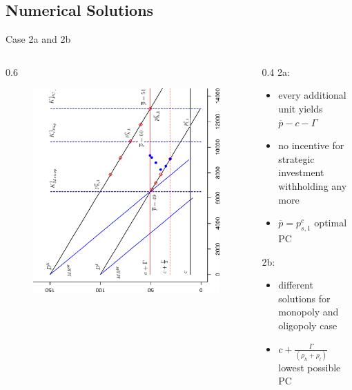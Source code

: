 

\subsection{Numerical Solutions}

\begin{frame} {Case 2a and 2b}
					
\begin{columns}
\begin{column} {0.6\textwidth}
\begin{figure}[h]
\centering
\includegraphics[width=1.0\textwidth, angle=270]{44}
    \label{fig:1}            
\end{figure}
\end{column}

\begin{column} {0.4\textwidth}
2a:
\begin{itemize}
	\item every additional unit yields $\overline{p}- c -\Gamma$
	\item no incentive for strategic investment withholding any more
	\item $\overline{p} = p_{s,1}^{c}$ optimal PC
\end{itemize}
2b:
\begin{itemize}
	\item different solutions for monopoly and oligopoly case
	\item $c+\tfrac{\Gamma}{(\rho_h+\rho_l)}$ lowest possible PC
\end{itemize}


\end{column}
\end{columns}
\end{frame}
